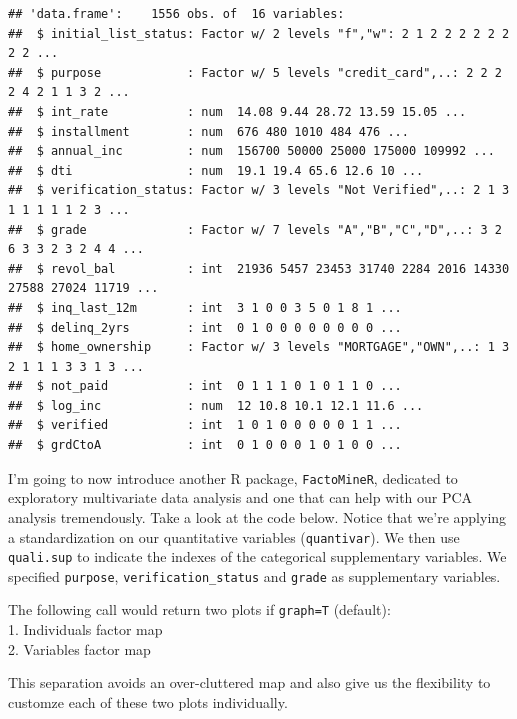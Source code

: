 \documentclass[]{article}
\begin{document}
\begin{verbatim}
## 'data.frame':    1556 obs. of  16 variables:
##  $ initial_list_status: Factor w/ 2 levels "f","w": 2 1 2 2 2 2 2 2 2 2 ...
##  $ purpose            : Factor w/ 5 levels "credit_card",..: 2 2 2 2 4 2 1 1 3 2 ...
##  $ int_rate           : num  14.08 9.44 28.72 13.59 15.05 ...
##  $ installment        : num  676 480 1010 484 476 ...
##  $ annual_inc         : num  156700 50000 25000 175000 109992 ...
##  $ dti                : num  19.1 19.4 65.6 12.6 10 ...
##  $ verification_status: Factor w/ 3 levels "Not Verified",..: 2 1 3 1 1 1 1 1 2 3 ...
##  $ grade              : Factor w/ 7 levels "A","B","C","D",..: 3 2 6 3 3 2 3 2 4 4 ...
##  $ revol_bal          : int  21936 5457 23453 31740 2284 2016 14330 27588 27024 11719 ...
##  $ inq_last_12m       : int  3 1 0 0 3 5 0 1 8 1 ...
##  $ delinq_2yrs        : int  0 1 0 0 0 0 0 0 0 0 ...
##  $ home_ownership     : Factor w/ 3 levels "MORTGAGE","OWN",..: 1 3 2 1 1 1 3 3 1 3 ...
##  $ not_paid           : int  0 1 1 1 0 1 0 1 1 0 ...
##  $ log_inc            : num  12 10.8 10.1 12.1 11.6 ...
##  $ verified           : int  1 0 1 0 0 0 0 0 1 1 ...
##  $ grdCtoA            : int  0 1 0 0 0 1 0 1 0 0 ...
\end{verbatim}

I'm going to now introduce another R package, \texttt{FactoMineR},
dedicated to exploratory multivariate data analysis and one that can
help with our PCA analysis tremendously. Take a look at the code below.
Notice that we're applying a standardization on our quantitative
variables (\texttt{quantivar}). We then use \texttt{quali.sup} to
indicate the indexes of the categorical supplementary variables. We
specified \texttt{purpose}, \texttt{verification\_status} and
\texttt{grade} as supplementary variables.

The following call would return two plots if \texttt{graph=T}
(default):\\
1. Individuals factor map\\
2. Variables factor map

This separation avoids an over-cluttered map and also give us the
flexibility to customze each of these two plots individually.
\end{document}
